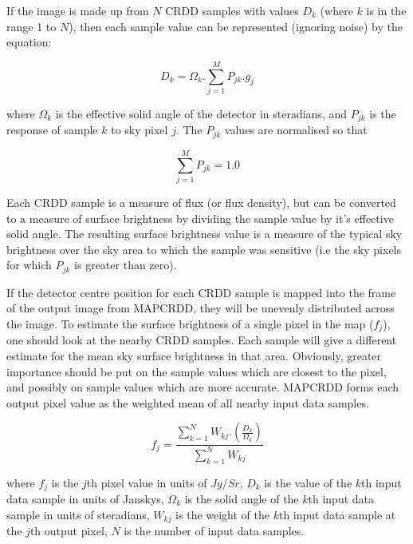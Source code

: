 If the image is made up from $N$ CRDD samples with values $D_{k}$ (where $k$ is 
in the range 1 to $N$), then each sample value can be represented (ignoring
noise) by the equation:

\begin {equation}
D_{k}=\Omega_{k}.\sum_{j=1}^{M} P_{jk}.g_{j} 
\end {equation}

where $\Omega_{k}$ is the effective solid angle of the detector in steradians,
and $P_{jk}$ is the response of sample $k$ to sky pixel $j$. The $P_{jk}$ values
are normalised so that 

\begin {equation}
\sum_{j=1}^{M} P_{jk} = 1.0 
\end {equation}

Each CRDD sample is a measure of flux (or flux density), but can be converted to
a measure of surface brightness by dividing the sample value by it's effective
solid angle. The resulting surface brightness value is a measure of the typical
sky brightness over the sky area to which the sample was sensitive (i.e the sky
pixels for which $P_{jk}$ is greater than zero). 

If the detector centre position for each CRDD sample is mapped into the frame of
the output image from MAPCRDD, they will be unevenly distributed across the
image. To estimate the surface brightness of a single pixel in the map
($f_{j}$), one should look at the nearby CRDD samples. Each sample will give a
different estimate for the mean sky surface brightness in that area. Obviously,
greater importance should be put on the sample values which are closest to the
pixel, and possibly on sample values which are more accurate. MAPCRDD forms each 
output pixel value as the weighted mean of all nearby input data samples. 

\begin{equation}
f_{j}=\frac{\sum_{k=1}^{N}W_{kj}.(\frac{D_{k}}{\Omega_{k}})}
{\sum_{k=1}^{N}W_{kj}}
\label {EQ:FJ}
\end{equation}

where $f_{j}$ is the $j$th pixel value in units of $Jy/Sr$, $D_{k}$ is the value 
of the $k$th input data sample in units of Janskys, $\Omega_{k}$ is the solid 
angle of the $k$th input data sample in units of steradians, $W_{kj}$ is the 
weight of the $k$th input data sample at the $j$th output pixel, $N$ is the
number of input data samples.

